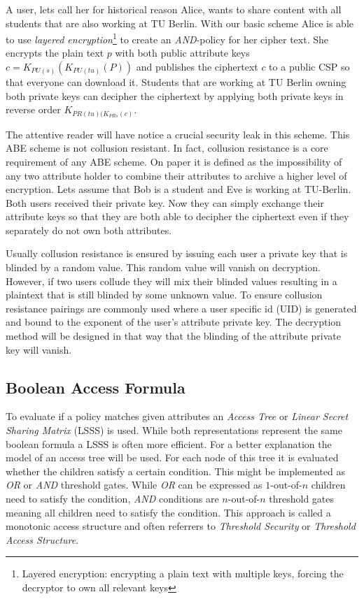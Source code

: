 A user, lets call her for historical reason Alice, wants to share content with all students that are also working at TU Berlin. With our basic scheme Alice is able to use \textit{layered encryption}\footnote{Layered encryption: encrypting a plain text with multiple keys, forcing the decryptor to own all relevant keys} to create an \textit{AND}-policy for her cipher text. She encrypts the plain text $p$ with both public attribute keys $c = K_{PU(s)}(K_{PU(tu)}(P))$ and publishes the ciphertext $c$ to a public CSP so that everyone can download it. Students that are working at TU Berlin owning both private keys can decipher the ciphertext by applying both private keys in reverse order $K_{PR(tu)(K_{PR{s}}(c)}$.

The attentive reader will have notice a crucial security leak in this scheme. This \ac{ABE} scheme is not collusion resistant. In fact, collusion resistance is a core requirement of any ABE scheme. On paper it is defined as the impossibility of any two attribute holder to combine their attributes to archive a higher level of encryption. Lets assume that Bob is a student and Eve is working at \ac{TU}-Berlin. Both users received their private key. Now they can simply exchange their attribute keys so that they are both able to decipher the ciphertext even if they separately do not own both attributes.  

Usually collusion resistance is ensured by issuing each user a private key that is blinded by a random value. This random value will vanish on decryption. However, if two users collude they will mix their blinded values resulting in a plaintext that is still blinded by some unknown value. To ensure collusion resistance pairings are commonly used where a user specific id (\ac{UID}) is generated and bound to the exponent of the user's attribute private key. The decryption method will be designed in that way that the blinding of the attribute private key will vanish. 

\subsection{Boolean Access Formula}
To evaluate if a policy matches given attributes an \textit{Access Tree} or \textit{Linear Secret Sharing Matrix} (\ac{LSSS}) is used. While both representations represent the same boolean formula a \ac{LSSS} is often more efficient. For a better explanation the model of an access tree will be used. For each node of this tree it is evaluated whether the children satisfy a certain condition. This might be implemented as \textit{OR} or \textit{AND} threshold gates. While \textit{OR} can be expressed as $1$-out-of-$n$ children need to satisfy the condition, \textit{AND} conditions are $n$-out-of-$n$ threshold gates meaning all children need to satisfy the condition. This approach is called a monotonic access structure and often referrers to \textit{Threshold Security} or \textit{Threshold Access Structure}. 


